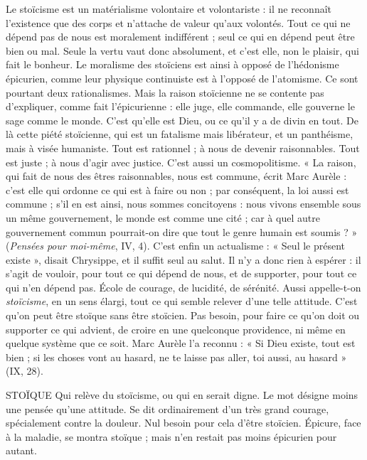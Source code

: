 Le stoïcisme est un matérialisme volontaire et volontariste : il ne reconnaît
l'existence que des corps et n’attache de valeur qu'aux volontés. Tout ce qui ne
dépend pas de nous est moralement indifférent ; seul ce qui en dépend peut
être bien ou mal. Seule la vertu vaut donc absolument, et c’est elle, non le
plaisir, qui fait le bonheur. Le moralisme des stoïciens est ainsi à opposé de
l’hédonisme épicurien, comme leur physique continuiste est à l’opposé de l’atomisme.
Ce sont pourtant deux rationalismes. Mais la raison stoïcienne ne se
contente pas d’expliquer, comme fait l’épicurienne : elle juge, elle commande,
elle gouverne le sage comme le monde. C’est qu’elle est Dieu, ou ce qu’il y a de
divin en tout. De là cette piété stoïcienne, qui est un fatalisme mais libérateur,
et un panthéisme, mais à visée humaniste. Tout est rationnel ; à nous de
devenir raisonnables. Tout est juste ; à nous d’agir avec justice. C’est aussi un
cosmopolitisme. « La raison, qui fait de nous des êtres raisonnables, nous est
commune, écrit Marc Aurèle : c’est elle qui ordonne ce qui est à faire ou non ;
par conséquent, la loi aussi est commune ; s’il en est ainsi, nous sommes
concitoyens : nous vivons ensemble sous un même gouvernement, le monde
est comme une cité ; car à quel autre gouvernement commun pourrait-on dire
que tout le genre humain est soumis ? » ({\it Pensées pour moi-même}, IV, 4). C’est
enfin un actualisme : « Seul le présent existe », disait Chrysippe, et il suffit seul
au salut. Il n’y a donc rien à espérer : il s’agit de vouloir, pour tout ce qui
dépend de nous, et de supporter, pour tout ce qui n’en dépend pas. École de
courage, de lucidité, de sérénité. Aussi appelle-t-on {\it stoïcisme}, en un sens élargi,
tout ce qui semble relever d’une telle attitude. C’est qu’on peut être stoïque
sans être stoïcien. Pas besoin, pour faire ce qu’on doit ou supporter ce qui
advient, de croire en une quelconque providence, ni même en quelque système
que ce soit. Marc Aurèle l’a reconnu : « Si Dieu existe, tout est bien ; si les
choses vont au hasard, ne te laisse pas aller, toi aussi, au hasard » (IX, 28).

STOÏQUE Qui relève du stoïcisme, ou qui en serait digne. Le mot désigne
moins une pensée qu’une attitude. Se dit ordinairement d’un très
grand courage, spécialement contre la douleur. Nul besoin pour cela d’être
stoïcien. Épicure, face à la maladie, se montra stoïque ; mais n’en restait pas
moins épicurien pour autant.

